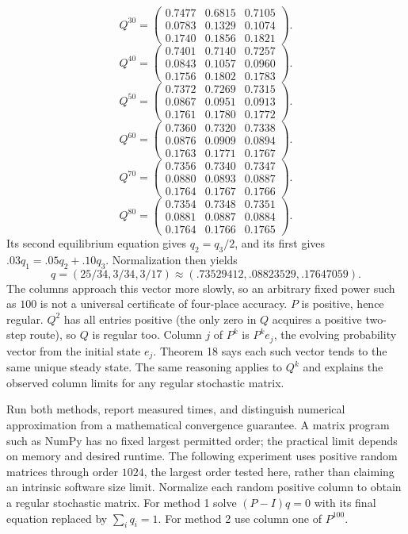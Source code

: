 \[ Q^{30}=\begin{pmatrix}0.7477&0.6815&0.7105\\0.0783&0.1329&0.1074\\0.1740&0.1856&0.1821\end{pmatrix}.\]
\[ Q^{40}=\begin{pmatrix}0.7401&0.7140&0.7257\\0.0843&0.1057&0.0960\\0.1756&0.1802&0.1783\end{pmatrix}.\]
\[ Q^{50}=\begin{pmatrix}0.7372&0.7269&0.7315\\0.0867&0.0951&0.0913\\0.1761&0.1780&0.1772\end{pmatrix}.\]
\[ Q^{60}=\begin{pmatrix}0.7360&0.7320&0.7338\\0.0876&0.0909&0.0894\\0.1763&0.1771&0.1767\end{pmatrix}.\]
\[ Q^{70}=\begin{pmatrix}0.7356&0.7340&0.7347\\0.0880&0.0893&0.0887\\0.1764&0.1767&0.1766\end{pmatrix}.\]
\[ Q^{80}=\begin{pmatrix}0.7354&0.7348&0.7351\\0.0881&0.0887&0.0884\\0.1764&0.1766&0.1765\end{pmatrix}.\]
Its second equilibrium equation gives $q_2=q_3/2$, and its first gives
$.03q_1=.05q_2+.10q_3$. Normalization then yields
\[
 q=(25/34,3/34,3/17)\approx(.73529412,.08823529,.17647059).
\]
The columns approach this vector more slowly, so an arbitrary fixed power
such as $100$ is not a universal certificate of four-place accuracy.
$P$ is positive, hence regular. $Q^2$ has all entries positive (the only
zero in $Q$ acquires a positive two-step route), so $Q$ is regular too.
Column $j$ of $P^k$ is $P^ke_j$, the evolving probability vector from the
initial state $e_j$. Theorem 18 says each such vector tends to the same
unique steady state. The same reasoning applies to $Q^k$ and explains the
observed column limits for any regular stochastic matrix.

\goal Run both methods, report measured times, and distinguish numerical
approximation from a mathematical convergence guarantee.
A matrix program such as NumPy has no fixed largest permitted order;
the practical limit depends on memory and desired runtime. The following
experiment uses positive random matrices through order $1024$, the largest
order tested here, rather than claiming an intrinsic software size limit.
Normalize each random positive column to obtain a regular stochastic matrix.
For method 1 solve $(P-I)q=0$ with its final equation replaced by
$\sum_iq_i=1$. For method 2 use column one of $P^{100}$.

